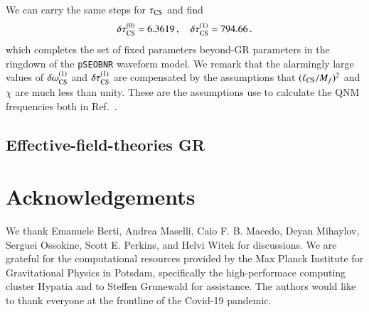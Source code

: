 \documentclass[twocolumn,
               prd,
               aps,
               superscriptaddress,
               tightenlines,
               nofootinbib,
               eqsecnum,
               amsfonts,
               amsmath,
               longbibliography]{revtex4-1}
\newcommand{\pSEOB}{\texttt{pSEOBNR}}
\begin{document}
We can carry the same steps for $\tau_{\rm CS}$ and find
%
\begin{equation}
\delta \tau^{(0)}_{\rm CS} = 6.3619\,, \quad \delta \tau^{(1)}_{\rm CS} = 794.66\,.
\label{eq:cs_tau_coefs}
\end{equation}
%
which completes the set of fixed parameters beyond-GR parameters in the ringdown of the \pSEOB{} waveform model.
%
We remark that the alarmingly large values of $\delta \omega_{\rm CS}^{(1)}$ and $\delta \tau_{\rm CS}^{(1)}$
are compensated by the assumptions that $(\ell_{\rm CS} / M_f)^2$ and $\chi$ are much less than unity. These
are the assumptions use to calculate the QNM frequencies both in Ref.~\cite{Wagle:2021tam}.

\subsection{Effective-field-theories GR}
\label{app:map_eftofgr}



\section*{Acknowledgements}
\label{sec:acknowledgements}
%
We thank Emanuele Berti, Andrea Maselli, Caio F. B. Macedo, Deyan Mihaylov,
Serguei Ossokine, Scott E. Perkins, and Helvi Witek for discussions.
%
We are grateful for the computational resources provided by the Max Planck
Institute for Gravitational Physics in Potsdam, specifically the
high-performace computing cluster Hypatia and to Steffen Grunewald for
assistance.
%
The authors would like to thank everyone at the frontline of the Covid-19
pandemic.

% 

\end{document}
